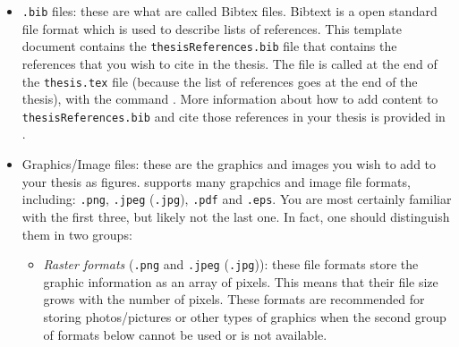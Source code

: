 \documentclass[11pt,twoside,openright]{report}
\begin{document}
\begin{itemize}[noitemsep]
\begin{itemize}[noitemsep]
        \item Existing packages that can simply be loaded in \verb|.tex| or \verb|.ply|. Existing packages are loaded using the \verb|\usepackage{...}| function and you can see at the beginning of the \verb|thesis.tex| file that this thesis template already loads a dozen packages. While we think these packages should already enable you to do most things you may wish to do in a thesis (e.g. add URLs or having figures with sub-figures), you may have additional needs. For this, simply search the resources listed in .
    \end{itemize}
  
  \item \verb|.bib| files: these are what are called Bibtex files. Bibtext is a open standard file format which is used to describe lists of references. This template document contains the \verb|thesisReferences.bib| file that contains the references that you wish to cite in the thesis. The file is called at the end of the \verb|thesis.tex| file (because the list of references goes at the end of the thesis), with the command \verb||.
  More information about how to add content to \verb|thesisReferences.bib| and cite those references in your thesis is provided in .
  
  \item Graphics/Image files: these are the graphics and images you wish to add to your thesis as figures.  supports many grapchics and image file formats, including: \verb|.png|, \verb|.jpeg| (\verb|.jpg|), \verb|.pdf| and \verb|.eps|. 
  You are most certainly familiar with the first three, but likely not the last one. 
  In fact, one should distinguish them in two groups:
      \begin{itemize}[noitemsep]
        \item \emph{Raster formats} (\verb|.png| and \verb|.jpeg| (\verb|.jpg|)): these file formats store the graphic information as an array of pixels. This means that their file size grows with the number of pixels. These formats are recommended for storing photos/pictures or other types of graphics when the second group of formats below cannot be used or is not available. 
        

\end{itemize}
\end{itemize}
\end{document}
